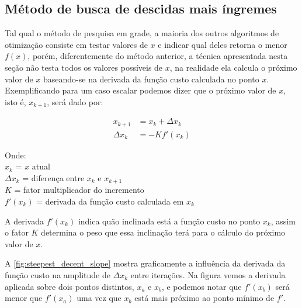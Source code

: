 \subsection{Método de busca de descidas mais íngremes}
\label{subsec:metodo_descida_mais_ingreme}

Tal qual o método de pesquisa em grade, a maioria dos outros algoritmos de otimização
consiste em testar valores de $x$ e indicar qual deles retorna o menor $f(x)$,
porém, diferentemente do método anterior, a técnica apresentada nesta seção não testa
todos os valores possíveis de $x$, na realidade ela calcula o próximo valor de $x$ baseando-se
na derivada da função custo calculada no ponto $x$. Exemplificando para um caso escalar
podemos dizer que o próximo valor de $x$, isto é, $x_{k+1}$, será dado por:

\begin{subequations}
	\begin{align}
		x_{k+1} &= x_k + \Delta x_k		\label{eq:steepest_decent_xk1_a} \\ 
		\Delta x_k &= -K f'(x_k)		\label{eq:steepest_decent_xk1_b}
	\end{align}
\end{subequations}

\noindent
Onde: \\
$x_k$ = $x$ atual \\
$\Delta x_k$ = diferença entre $x_k$ e $x_{k+1}$ \\
$K$ = fator multiplicador do incremento \\
$f'(x_k)$ = derivada da função custo calculada em $x_k$
\newline

A derivada $f'(x_k)$ indica quão inclinada está a função custo no ponto $x_k$,
assim o fator $K$ determina o peso que essa inclinação terá para o cálculo do
próximo valor de $x$.

A \cref{fig:steepest_decent_slope} mostra graficamente a influência da derivada
da função custo na amplitude de $\Delta x_k$ entre iterações. Na figura vemos
a derivada aplicada sobre dois pontos distintos, $x_a$ e $x_b$, e podemos notar
que $f'(x_b)$ será menor que $f'(x_a)$ uma vez que $x_b$ está mais próximo ao 
ponto mínimo de $f'$.

